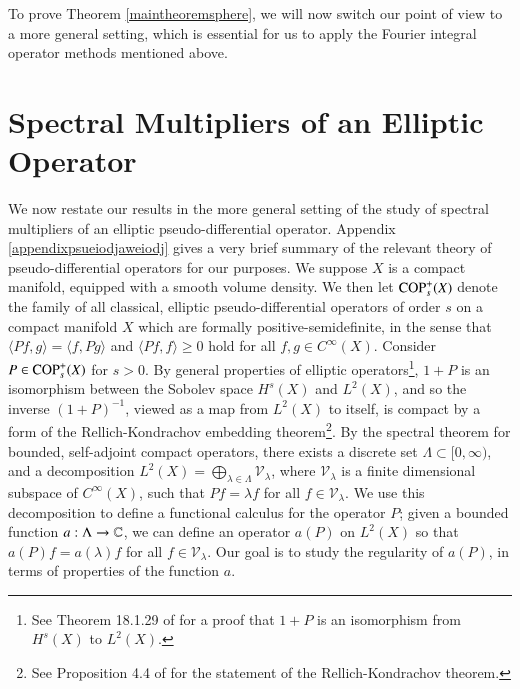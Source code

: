 To prove Theorem \ref{maintheoremsphere}, we will now switch our point of view to a more general setting, which is essential for us to apply the Fourier integral operator methods mentioned above.

\section{Spectral Multipliers of an Elliptic Operator}

We now restate our results in the more general setting of the study of spectral multipliers of an elliptic pseudo-differential operator. Appendix \ref{appendixpsueiodjaweiodj} gives a very brief summary of the relevant theory of pseudo-differential operators for our purposes. We suppose $X$ is a compact manifold, equipped with a smooth volume density. We then let ${\text{COP}^{+}_{{s}}}(X)$ denote the family of all classical, elliptic pseudo-differential operators of order $s$ on a compact manifold $X$ which are formally positive-semidefinite, in the sense that $\langle Pf, g \rangle = \langle f, Pg \rangle$ and $\langle Pf, f \rangle \geq 0$ hold for all $f,g \in C^\infty(X)$. Consider $P \in {\text{COP}^{+}_{{s}}}(X)$ for $s > 0$. By general properties of elliptic operators\footnote{See Theorem 18.1.29 of \cite{Hormander3} for a proof that $1 + P$ is an isomorphism from $H^s(X)$ to $L^2(X)$.}, $1 + P$ is an isomorphism between the Sobolev space $H^s(X)$ and $L^2(X)$,
%
%
and so the inverse $(1 + P)^{-1}$, viewed as a map from $L^2(X)$ to itself, is compact by a form of the Rellich-Kondrachov embedding theorem\footnote{See Proposition 4.4 of \cite{Taylor} for the statement of the Rellich-Kondrachov theorem.}. By the spectral theorem for bounded, self-adjoint compact operators, there exists a discrete set $\Lambda \subset [0,\infty)$, and a decomposition $L^2(X) = \bigoplus\nolimits_{\lambda \in \Lambda} \mathcal{V}_\lambda$, where $\mathcal{V}_\lambda$ is a finite dimensional subspace of $C^\infty(X)$, such that $Pf = \lambda f$ for all $f \in \mathcal{V}_\lambda$. We use this decomposition to define a functional calculus for the operator $P$; given a bounded function $a: \Lambda \to \operatorname{\mathbb{C}}$, we can define an operator $a(P)$ on $L^2(X)$ so that $a(P) f = a(\lambda) f$ for all $f \in \mathcal{V}_\lambda$. Our goal is to study the regularity of $a(P)$, in terms of properties of the function $a$.

